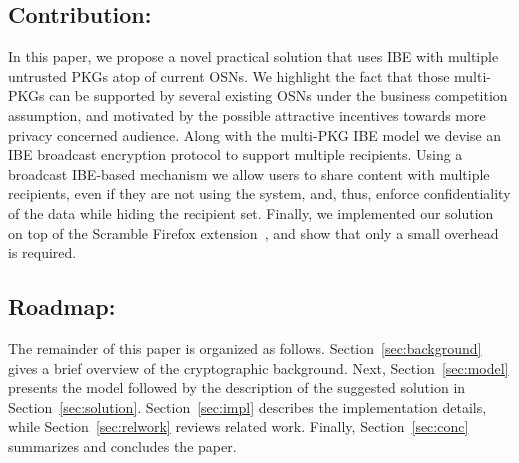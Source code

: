 \documentclass[journal]{IEEEtran}
\newcommand{\secref}[1]{{Section}~\ref{#1}}
\begin{document}

\subsection{Contribution:} In this paper, we propose a novel practical solution that uses IBE with multiple untrusted PKGs atop of current OSNs. 
We highlight the fact that those multi-PKGs can be supported by several existing OSNs under the business competition assumption, and motivated by the possible attractive incentives towards more privacy concerned audience. 
Along with the multi-PKG IBE model we devise an IBE broadcast encryption protocol to support multiple recipients. Using a broadcast IBE-based mechanism we allow users to share content with multiple recipients, even if they are not using the system, and, thus, enforce confidentiality of the data while hiding the recipient set. Finally, we implemented our solution on top of the Scramble Firefox extension~\cite{BeatoScramble}, and show that only a small overhead is required.
 
\subsection{Roadmap:} The remainder of this paper is organized as follows. \secref{sec:background} gives a brief overview of the cryptographic background. Next, \secref{sec:model} presents the model followed by the description of the suggested solution in \secref{sec:solution}. \secref{sec:impl} describes the implementation details, while \secref{sec:relwork} reviews related work. Finally, \secref{sec:conc} summarizes and concludes the paper.
\end{document}
